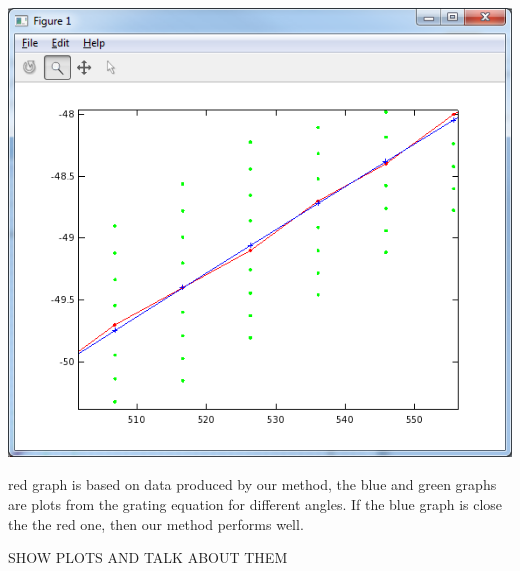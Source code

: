 \includegraphics[scale=0.5]{images/blaze2500_75_closeup2.png}

red graph is based on data produced by our method, the blue and green graphs are plots from the grating equation for different angles. If the blue graph is close the the red one, then our method performs well. 

SHOW PLOTS AND TALK ABOUT THEM

